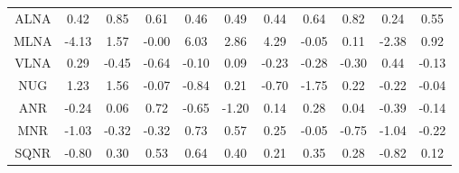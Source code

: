 \documentclass[11pt,a4paper]{report}
\begin{document}
\begin{longtable}{ | c || c | c | c | c | c | c | c | c | c || c |}
ALNA &  \cellcolor[HTML]{F7F7FF} 0.42 &  \cellcolor[HTML]{E7E7FF} 0.85 &  \cellcolor[HTML]{EFEFFF} 0.61 &  \cellcolor[HTML]{F7F7FF} 0.46 &  \cellcolor[HTML]{EFEFFF} 0.49 &  \cellcolor[HTML]{F7F7FF} 0.44 &  \cellcolor[HTML]{EFEFFF} 0.64 &  \cellcolor[HTML]{E7E7FF} 0.82 &  \cellcolor[HTML]{F7F7FF} 0.24 &  \cellcolor[HTML]{EFEFFF} 0.55 \\
MLNA &  \cellcolor[HTML]{FF9797} -4.13 &  \cellcolor[HTML]{D7D7FF} 1.57 &  \cellcolor[HTML]{FFFFFF} -0.00 &  \cellcolor[HTML]{6868FF} 6.03 &  \cellcolor[HTML]{B7B7FF} 2.86 &  \cellcolor[HTML]{9797FF} 4.29 &  \cellcolor[HTML]{FFFFFF} -0.05 &  \cellcolor[HTML]{FFFFFF} 0.11 &  \cellcolor[HTML]{FFC7C7} -2.38 &  \cellcolor[HTML]{E7E7FF} 0.92 \\
VLNA &  \cellcolor[HTML]{F7F7FF} 0.29 &  \cellcolor[HTML]{FFF7F7} -0.45 &  \cellcolor[HTML]{FFEFEF} -0.64 &  \cellcolor[HTML]{FFFFFF} -0.10 &  \cellcolor[HTML]{FFFFFF} 0.09 &  \cellcolor[HTML]{FFF7F7} -0.23 &  \cellcolor[HTML]{FFF7F7} -0.28 &  \cellcolor[HTML]{FFF7F7} -0.30 &  \cellcolor[HTML]{F7F7FF} 0.44 &  \cellcolor[HTML]{FFFFFF} -0.13 \\
NUG &  \cellcolor[HTML]{DFDFFF} 1.23 &  \cellcolor[HTML]{D7D7FF} 1.56 &  \cellcolor[HTML]{FFFFFF} -0.07 &  \cellcolor[HTML]{FFE7E7} -0.84 &  \cellcolor[HTML]{F7F7FF} 0.21 &  \cellcolor[HTML]{FFEFEF} -0.70 &  \cellcolor[HTML]{FFCFCF} -1.75 &  \cellcolor[HTML]{F7F7FF} 0.22 &  \cellcolor[HTML]{FFF7F7} -0.22 &  \cellcolor[HTML]{FFFFFF} -0.04 \\
ANR &  \cellcolor[HTML]{FFF7F7} -0.24 &  \cellcolor[HTML]{FFFFFF} 0.06 &  \cellcolor[HTML]{EFEFFF} 0.72 &  \cellcolor[HTML]{FFEFEF} -0.65 &  \cellcolor[HTML]{FFDFDF} -1.20 &  \cellcolor[HTML]{FFFFFF} 0.14 &  \cellcolor[HTML]{F7F7FF} 0.28 &  \cellcolor[HTML]{FFFFFF} 0.04 &  \cellcolor[HTML]{FFF7F7} -0.39 &  \cellcolor[HTML]{FFFFFF} -0.14 \\
MNR &  \cellcolor[HTML]{FFE7E7} -1.03 &  \cellcolor[HTML]{FFF7F7} -0.32 &  \cellcolor[HTML]{FFF7F7} -0.32 &  \cellcolor[HTML]{EFEFFF} 0.73 &  \cellcolor[HTML]{EFEFFF} 0.57 &  \cellcolor[HTML]{F7F7FF} 0.25 &  \cellcolor[HTML]{FFFFFF} -0.05 &  \cellcolor[HTML]{FFEFEF} -0.75 &  \cellcolor[HTML]{FFE7E7} -1.04 &  \cellcolor[HTML]{FFF7F7} -0.22 \\
SQNR &  \cellcolor[HTML]{FFE7E7} -0.80 &  \cellcolor[HTML]{F7F7FF} 0.30 &  \cellcolor[HTML]{EFEFFF} 0.53 &  \cellcolor[HTML]{EFEFFF} 0.64 &  \cellcolor[HTML]{F7F7FF} 0.40 &  \cellcolor[HTML]{F7F7FF} 0.21 &  \cellcolor[HTML]{F7F7FF} 0.35 &  \cellcolor[HTML]{F7F7FF} 0.28 &  \cellcolor[HTML]{FFE7E7} -0.82 &  \cellcolor[HTML]{FFFFFF} 0.12 \\

\end{longtable}
\end{document}
